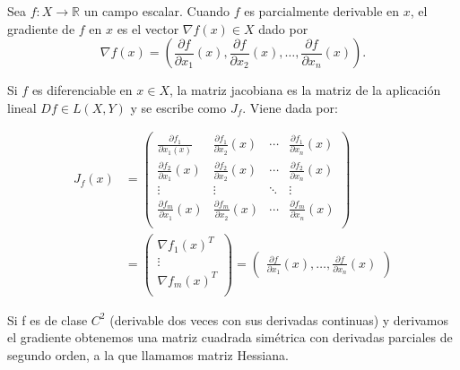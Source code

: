 \begin{definicion}
    Sea $f:X \rightarrow \mathbb{R}$ un campo escalar. Cuando $f$ es parcialmente derivable en $x$, el gradiente de $f$ en $x$ es el vector $\nabla f(x) \in X$ dado por 
    $$\nabla f(x) = \left ( \frac{\partial f}{\partial x_1}(x), \frac{\partial f}{\partial x_2}(x), \ldots, \frac{\partial f}{\partial x_n}(x) \right ).$$
\end{definicion}


\begin{definicion}
    Si $f$ es diferenciable en $ x \in X$, la matriz jacobiana es la matriz de la aplicación lineal $Df \in L \left ( X, Y \right )$ y se escribe como $J_f$. Viene dada por:

 \begin{align*}
	J_f(x)&= \begin{pmatrix}
	 \frac{\partial f_1}{\partial x_1(x)} & \frac{\partial f_1}{\partial x_2}(x) & \cdots & \frac{\partial f_1}{\partial x_n}(x) \\
	 \frac{\partial f_2}{\partial x_1}(x) & \frac{\partial f_2}{\partial x_2}(x) & \cdots & \frac{\partial f_2}{\partial x_n}(x) \\
	 \vdots & \vdots & \ddots & \vdots \\
	 \frac{\partial f_m}{\partial x_1}(x) & \frac{\partial f_m}{\partial x_2}(x) & \cdots & \frac{\partial f_m}{\partial x_n}(x) \\
	\end{pmatrix} \\	
	&= \begin{pmatrix}
	 \nabla f_1(x)^T\\
	 \vdots \\
	 \nabla f_m(x)^T \\
	\end{pmatrix}=
	\begin{pmatrix}
	     \frac{\partial f}{\partial x_1}(x), \ldots, \frac{\partial f}{\partial x_n}(x)
	\end{pmatrix}
\end{align*}

\end{definicion}



Si f es de clase $C^2$ (derivable dos veces con sus derivadas continuas) y derivamos el gradiente obtenemos una matriz cuadrada simétrica con derivadas parciales de segundo orden, a la que llamamos matriz Hessiana.

